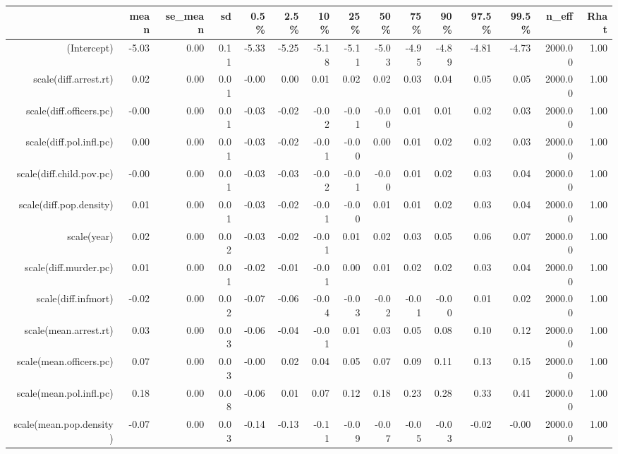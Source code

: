 \begin{table}[ht]
\centering
\begin{tabular}{rrrrrrrrrrrrrrr}
  \hline
 & mean & se\_mean & sd & 0.5\% & 2.5\% & 10\% & 25\% & 50\% & 75\% & 90\% & 97.5\% & 99.5\% & n\_eff & Rhat \\ 
  \hline
(Intercept) & -5.03 & 0.00 & 0.11 & -5.33 & -5.25 & -5.18 & -5.11 & -5.03 & -4.95 & -4.89 & -4.81 & -4.73 & 2000.00 & 1.00 \\ 
  scale(diff.arrest.rt) & 0.02 & 0.00 & 0.01 & -0.00 & 0.00 & 0.01 & 0.02 & 0.02 & 0.03 & 0.04 & 0.05 & 0.05 & 2000.00 & 1.00 \\ 
  scale(diff.officers.pc) & -0.00 & 0.00 & 0.01 & -0.03 & -0.02 & -0.02 & -0.01 & -0.00 & 0.01 & 0.01 & 0.02 & 0.03 & 2000.00 & 1.00 \\ 
  scale(diff.pol.infl.pc) & 0.00 & 0.00 & 0.01 & -0.03 & -0.02 & -0.01 & -0.00 & 0.00 & 0.01 & 0.02 & 0.02 & 0.03 & 2000.00 & 1.00 \\ 
  scale(diff.child.pov.pc) & -0.00 & 0.00 & 0.01 & -0.03 & -0.03 & -0.02 & -0.01 & -0.00 & 0.01 & 0.02 & 0.03 & 0.04 & 2000.00 & 1.00 \\ 
  scale(diff.pop.density) & 0.01 & 0.00 & 0.01 & -0.03 & -0.02 & -0.01 & -0.00 & 0.01 & 0.01 & 0.02 & 0.03 & 0.04 & 2000.00 & 1.00 \\ 
  scale(year) & 0.02 & 0.00 & 0.02 & -0.03 & -0.02 & -0.01 & 0.01 & 0.02 & 0.03 & 0.05 & 0.06 & 0.07 & 2000.00 & 1.00 \\ 
  scale(diff.murder.pc) & 0.01 & 0.00 & 0.01 & -0.02 & -0.01 & -0.01 & 0.00 & 0.01 & 0.02 & 0.02 & 0.03 & 0.04 & 2000.00 & 1.00 \\ 
  scale(diff.infmort) & -0.02 & 0.00 & 0.02 & -0.07 & -0.06 & -0.04 & -0.03 & -0.02 & -0.01 & -0.00 & 0.01 & 0.02 & 2000.00 & 1.00 \\ 
  scale(mean.arrest.rt) & 0.03 & 0.00 & 0.03 & -0.06 & -0.04 & -0.01 & 0.01 & 0.03 & 0.05 & 0.08 & 0.10 & 0.12 & 2000.00 & 1.00 \\ 
  scale(mean.officers.pc) & 0.07 & 0.00 & 0.03 & -0.00 & 0.02 & 0.04 & 0.05 & 0.07 & 0.09 & 0.11 & 0.13 & 0.15 & 2000.00 & 1.00 \\ 
  scale(mean.pol.infl.pc) & 0.18 & 0.00 & 0.08 & -0.06 & 0.01 & 0.07 & 0.12 & 0.18 & 0.23 & 0.28 & 0.33 & 0.41 & 2000.00 & 1.00 \\ 
  scale(mean.pop.density) & -0.07 & 0.00 & 0.03 & -0.14 & -0.13 & -0.11 & -0.09 & -0.07 & -0.05 & -0.03 & -0.02 & -0.00 & 2000.00 & 1.00 \\ 

\end{tabular}
\end{table}
